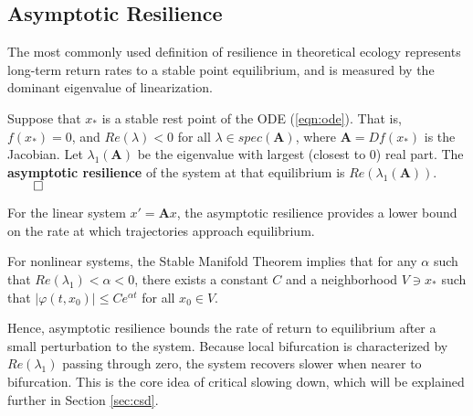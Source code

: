 \subsection{Asymptotic Resilience}

The most commonly used definition of resilience in theoretical ecology represents long-term return rates to a stable point equilibrium, and is measured by the dominant eigenvalue of linearization. 

\begin{definition}
	\label{def:asymp}
	Suppose that $x_\ast$ is a stable rest point of the ODE (\ref{eqn:ode}). That is, $f(x_\ast) = 0$, and $Re(\lambda) < 0$ for all $\lambda \in spec(\textbf{A})$, where $\textbf{A} = Df(x_\ast)$ is the Jacobian. Let $\lambda_1(\textbf{A})$ be the eigenvalue with largest (closest to 0) real part. 
	The \textbf{asymptotic resilience} of the system at that equilibrium is $Re(\lambda_1(\textbf{A}))$. \( \qed \)
\end{definition}

For the linear system $x'= \textbf{A}x$, the asymptotic resilience provides a lower bound on the rate at which trajectories approach equilibrium. 

For nonlinear systems, the Stable Manifold Theorem implies 
that for any $\alpha$ such that $Re(\lambda_1) < \alpha < 0$, there exists a constant $C$ and a neighborhood $V \ni x_\ast$ such that  $|\varphi(t,x_0)| \leq Ce^{\alpha t}$ for all $x_0 \in V$.

Hence, asymptotic resilience bounds the rate of return to equilibrium after a small perturbation to the system. Because local bifurcation is characterized by $Re(\lambda_1)$ passing through zero, the system recovers slower when nearer to bifurcation. This is the core idea of critical slowing down, which will be explained further in Section \ref{sec:csd}.